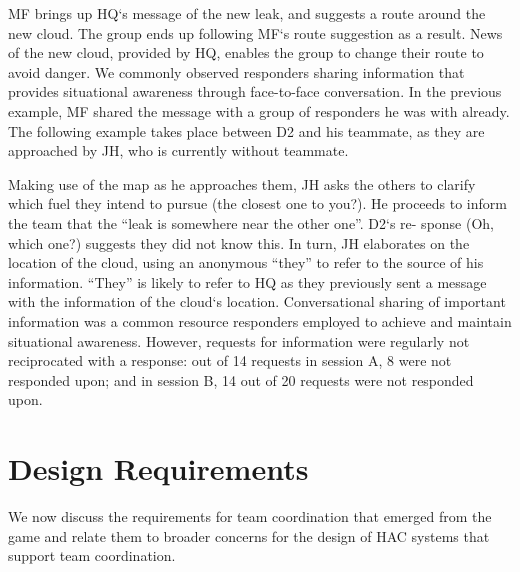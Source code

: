 MF brings up HQ`s message of the new leak, and suggests a route around the new cloud. The group ends up following MF`s route suggestion as a result. News of the new cloud, provided by HQ, enables the group to change their route to avoid danger. We commonly observed responders sharing information that provides situational awareness through face-to-face conversation. In the previous example, MF shared the message with a group of responders he was with already. The following example takes place between D2 and his teammate, as they are approached by JH, who is currently without teammate.\\

\noindent{} 


Making use of the map as he approaches them, JH asks the others to clarify which fuel they intend to pursue (the closest one to you?). He proceeds to inform the team that the ``leak is somewhere near the other one''. D2`s re- sponse (Oh, which one?) suggests they did not know this. In turn, JH elaborates on the location of the cloud, using an anonymous ``they'' to refer to the source of his information. ``They'' is likely to refer to HQ as they previously sent a message with the information of the cloud`s location. Conversational sharing of important information was a common resource responders employed to achieve and maintain situational awareness. However, requests for information were regularly not reciprocated with a response: out of 14 requests in session A, 8 were not responded upon; and in session B, 14 out of 20 requests were not responded upon.\\




\section{Design Requirements}
We now discuss the requirements for team coordination that emerged from the game and relate them to broader concerns for the design of HAC systems that support team coordination.\\

